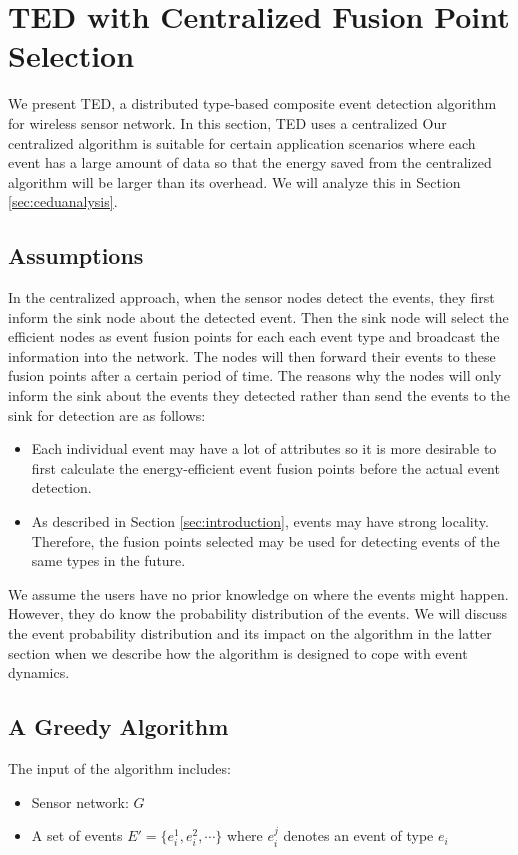 \section{TED with Centralized Fusion Point Selection}
\label{sec:centralized}
We present TED, a distributed type-based composite event detection algorithm for wireless sensor network. In this section, TED uses a centralized Our centralized algorithm is suitable for certain application scenarios where each event has a large amount of data so that the energy saved from the centralized algorithm will be larger than its overhead. We will analyze this in Section \ref{sec:ceduanalysis}.

\subsection{Assumptions}
In the centralized approach, when the sensor nodes detect the events, they first inform the sink node about the detected event. Then the sink node will select the efficient nodes as event fusion points for each each event type and broadcast the information into the network. The nodes will then forward their events to these fusion points after a certain period of time. The reasons why the nodes will only inform the sink about the events they detected rather than send the events to the sink for detection are as follows:
\begin{itemize}
\item Each individual event may have a lot of attributes so it is more desirable to first calculate the energy-efficient event fusion points before the actual event detection.
\item As described in Section \ref{sec:introduction}, events may have strong locality. Therefore, the fusion points selected may be used for detecting events of the same types in the future.
\end{itemize}

We assume the users have no prior knowledge on where the events might happen. However, they do know the probability distribution of the events. We will discuss the event probability distribution and its impact on the algorithm in the latter section when we describe how the algorithm is designed to cope with event dynamics.

\subsection{A Greedy Algorithm}
The input of the algorithm includes:
\begin{itemize}
\item Sensor network: \(G\)
\item A set of events \(E'=\{e_i^1, e_i^2, \cdots \}\) where \(e_i^j\) denotes an event of type \(e_i\)
\end{itemize}

